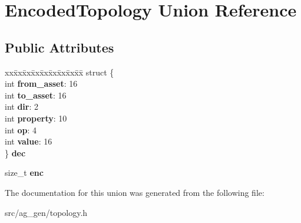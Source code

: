 \hypertarget{union_encoded_topology}{}\section{Encoded\+Topology Union Reference}
\label{union_encoded_topology}
\subsection*{Public Attributes}
\begin{DoxyCompactItemize}
\item 
\mbox{\label{union_encoded_topology_afaafcffae6ced53a27ab8a06745e1fef}} 
\begin{tabbing}
xx\=xx\=xx\=xx\=xx\=xx\=xx\=xx\=xx\=\kill
struct \{\\
\>int {\bfseries from\_asset}: 16\\
\>int {\bfseries to\_asset}: 16\\
\>int {\bfseries dir}: 2\\
\>int {\bfseries property}: 10\\
\>int {\bfseries op}: 4\\
\>int {\bfseries value}: 16\\
\} {\bfseries dec}\\

\end{tabbing}\item 
\mbox{\label{union_encoded_topology_a49d8caa1398285b6f0d57d963174705f}} 
size\+\_\+t {\bfseries enc}
\end{DoxyCompactItemize}


The documentation for this union was generated from the following file\+:\begin{DoxyCompactItemize}
\item 
src/ag\+\_\+gen/topology.\+h\end{DoxyCompactItemize}
